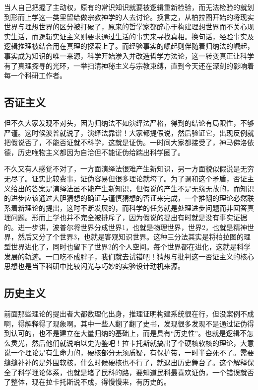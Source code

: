 \documentclass[]{book}
\begin{document}
当人自己把握了主动权，原有的常识知识就要被逻辑重新检验，而无法检验的就划到形而上学这一类里留给做宗教神学的人去讨论。换言之，从柏拉图开始的将现实世界与理想世界的区分被打破了，原来的哲学家都醉心于构建理想世界而不关心现实生活，而逻辑实证主义则要求通过生活的事实来寻找真相。换句话，经验事实及逻辑推理被结合用在真理的探索上了。而经验事实的崛起则伴随着归纳法的崛起，事实成为知识的唯一来源，科学开始渗入并改造哲学方法论，这一转变真正让科学有了真理探寻的光环，一举扫清神秘主义与宗教束缚，直到今天还在深刻的影响着每一个科研工作者。

\subsection{否证主义}

但不久大家发现不对头，因为归纳法不如演绎法严格，得到的结论有局限性，不够严谨。这时候波普就说了，演绎法靠谱！大家都提假说，然后验证它，出现反例就把假说否了，不能否证就不科学，这就是证伪。一时间大家都接受了，神马佛洛依德，历史唯物主义都因为自洽但不能证伪给踹出科学圈了。

不久又有人感觉不对了，一方面演绎法很难产生新知识，另一方面貌似假说是无穷无尽了。证实比较费事，证伪容易但很多理论就垮了。为了调和这个矛盾，否证主义给出的答案是演绎法虽不能产生新知识，但假说的产生不是无缘无故的，而知识的进步应该通过大胆猜想的确证与谨慎猜想的否证来完成，一个推翻的理论必然联系着新理论的提出，这时不断发展的，而科学的任务就是处理进步问题而非回答真理问题。形而上学也并不完全被排斥了，因为假说的提出有时就是没有事实证据的。进一步讲，波普尔将世界分成世界1，也就是物理世界，世界2，也就是精神世界，然后又分了个世界3，也就是客观知识世界。这种三分法其实是将柏拉图的理型世界进化了，同时也留下了世界2的个人空间。每个世界都在进化，这就是科学发展的轨迹。一口吃不成胖子，我们就去试错吧！猜想与批判这一否证主义的核心思想也是当下科研中比较闪光与巧妙的实验设计动机来源。

\subsection{历史主义}

前面那些理论的提出者大都数理化出身，推理证明构建系统很在行，但没案例不成啊，得解释得了现象啊。其中一些人翻了翻了史书，发现很多发现不是通过证伪得到认可的，也不是建立在大量归纳的基础上，而是具有``历史性''。也就是逻辑不怎么灵光，然后他们就说咱以史为鉴吧！拉卡托斯就搞出了个硬核软核的理论，大意说一个理论是有生命力的，硬核部分无须质疑，有保护带，一时半会死不了。需要缝缝补补的是外围软核，什么时候硬核也不行了，就退出历史舞台了。这个解释保全了科学理论体系，也就是堵了民科的路，要知道民科最喜欢证伪，一个错误就否了整体，现在拉卡托斯说不成，得慢慢来，有历史的。
\end{document}
